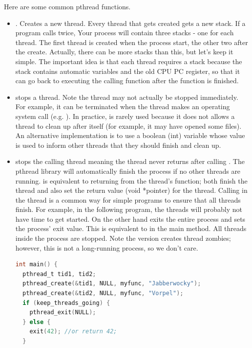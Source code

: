 Here are some common pthread functions.

\begin{itemize}
\item {}.
Creates a new thread.
Every thread that gets created gets a new stack.
If a program calls  twice, Your process will contain three stacks - one for each thread.
The first thread is created when the process start, the other two after the create.
Actually, there can be more stacks than this, but let's keep it simple.
The important idea is that each thread requires a stack because the stack contains automatic variables and the old CPU PC register, so that it can go back to executing the calling function after the function is finished.

\item {} stops a thread.
Note the thread may not actually be stopped immediately.
For example, it can be terminated when the thread makes an operating system call (e.g. ).
In practice,  is rarely used because it does not allows a thread to clean up after itself (for example, it may have opened some files).
An alternative implementation is to use a boolean (int) variable whose value is used to inform other threads that they should finish and clean up.

\item {} stops the calling thread meaning the thread never returns after calling .
The pthread library will automatically finish the process if no other threads are running.
 is equivalent to returning from the thread's function; both finish the thread and also set the return value (void *pointer) for the thread.
Calling  in the  thread is a common way for simple programs to ensure that all threads finish.
For example, in the following program, the  threads will probably not have time to get started.
On the other hand  exits the entire process and sets the process' exit value.
This is equivalent to  in the main method.
All threads inside the process are stopped.
Note the  version creates thread zombies; however, this is not a long-running process, so we don't care.

\begin{lstlisting}[language=C]
int main() {
  pthread_t tid1, tid2;
  pthread_create(&tid1, NULL, myfunc, "Jabberwocky");
  pthread_create(&tid2, NULL, myfunc, "Vorpel");
  if (keep_threads_going) {
    pthread_exit(NULL);
  } else {
    exit(42); //or return 42;
  }


\end{lstlisting}
\end{itemize}

